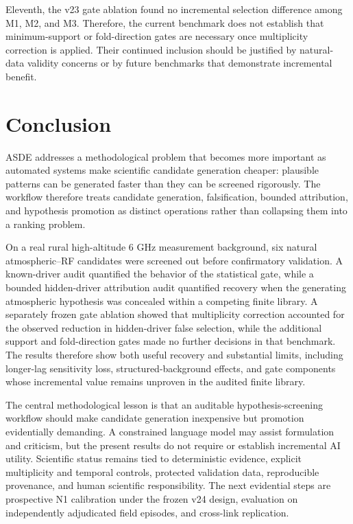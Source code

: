\documentclass{ieeeaccess}
\begin{document}
Eleventh, the v23 gate ablation found no incremental selection difference among M1, M2, and M3. Therefore, the current benchmark does not establish that minimum-support or fold-direction gates are necessary once multiplicity correction is applied. Their continued inclusion should be justified by natural-data validity concerns or by future benchmarks that demonstrate incremental benefit.

\section{Conclusion}\label{conclusion}

ASDE addresses a methodological problem that becomes more important as automated systems make scientific candidate generation cheaper: plausible patterns can be generated faster than they can be screened rigorously. The workflow therefore treats candidate generation, falsification, bounded attribution, and hypothesis promotion as distinct operations rather than collapsing them into a ranking problem.

On a real rural high-altitude 6 GHz measurement background, six natural atmospheric--RF candidates were screened out before confirmatory validation. A known-driver audit quantified the behavior of the statistical gate, while a bounded hidden-driver attribution audit quantified recovery when the generating atmospheric hypothesis was concealed within a competing finite library. A separately frozen gate ablation showed that multiplicity correction accounted for the observed reduction in hidden-driver false selection, while the additional support and fold-direction gates made no further decisions in that benchmark. The results therefore show both useful recovery and substantial limits, including longer-lag sensitivity loss, structured-background effects, and gate components whose incremental value remains unproven in the audited finite library.

The central methodological lesson is that an auditable hypothesis-screening workflow should make candidate generation inexpensive but promotion evidentially demanding. A constrained language model may assist formulation and criticism, but the present results do not require or establish incremental AI utility. Scientific status remains tied to deterministic evidence, explicit multiplicity and temporal controls, protected validation data, reproducible provenance, and human scientific responsibility. The next evidential steps are prospective N1 calibration under the frozen v24 design, evaluation on independently adjudicated field episodes, and cross-link replication.
\end{document}
